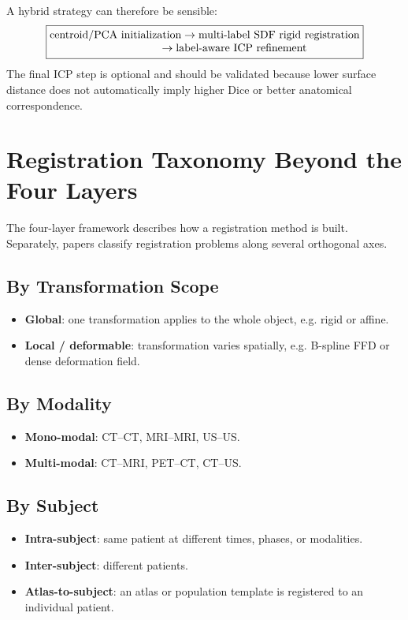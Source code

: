 \documentclass[11pt,a4paper]{article}
\begin{document}
A hybrid strategy can therefore be sensible:
\[
\boxed{
\begin{aligned}
&\text{centroid/PCA initialization}
\rightarrow
\text{multi-label SDF rigid registration}\\[-1mm]
&\hspace{35mm}\rightarrow
\text{label-aware ICP refinement}
\end{aligned}
}
\]
The final ICP step is optional and should be validated because lower surface distance does not automatically imply higher Dice or better anatomical correspondence.

\section{Registration Taxonomy Beyond the Four Layers}

The four-layer framework describes how a registration method is built. Separately, papers classify registration problems along several orthogonal axes.

\subsection{By Transformation Scope}

\begin{itemize}
  \item \textbf{Global}: one transformation applies to the whole object, e.g. rigid or affine.
  \item \textbf{Local / deformable}: transformation varies spatially, e.g. B-spline FFD or dense deformation field.
\end{itemize}

\subsection{By Modality}

\begin{itemize}
  \item \textbf{Mono-modal}: CT--CT, MRI--MRI, US--US.
  \item \textbf{Multi-modal}: CT--MRI, PET--CT, CT--US.
\end{itemize}

\subsection{By Subject}

\begin{itemize}
  \item \textbf{Intra-subject}: same patient at different times, phases, or modalities.
  \item \textbf{Inter-subject}: different patients.
  \item \textbf{Atlas-to-subject}: an atlas or population template is registered to an individual patient.
\end{itemize}
\end{document}
